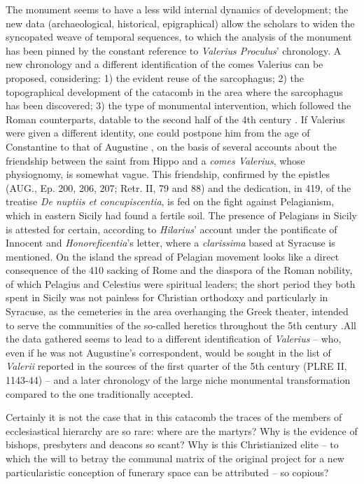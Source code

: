 \documentclass[amsthm,ebook]{saparticle}
\begin{document}
The monument seems to have a less wild internal dynamics of development; the new data (archaeological, historical, epigraphical) \citep[101-108]{SGARLATA1996} allow the scholars to widen the syncopated weave of temporal sequences, to which the analysis of the monument has been pinned by the constant reference to \emph{Valerius Proculus}’ chronology. A new chronology and a different identification of the comes Valerius can be proposed, considering: 1) the evident reuse of the sarcophagus; 2) the topographical development of the catacomb in the area where the sarcophagus has been discovered; 3) the type of monumental intervention, which followed the Roman counterparts, datable to the second half of the 4th century \citep[132-134]{FIOCCHINICOLAI1997}. If Valerius were given a different identity, one could postpone him from the age of Constantine to that of Augustine \citep[15-51]{SGARLATA1998}, on the basis of several accounts about the friendship between the saint from Hippo and a \emph{comes Valerius}, whose physiognomy, is somewhat vague. This friendship, confirmed by the epistles (AUG., Ep. 200, 206, 207; Retr. II, 79 and 88) and the dedication, in 419, of the treatise \emph{De nuptiis et concupiscentia}, is fed on the fight against Pelagianism, which in eastern Sicily had found a fertile soil. The presence of Pelagians in Sicily is attested for certain, according to \emph{Hilarius}’ account under the pontificate of Innocent \citep[429-452]{PIETRI2000} and \emph{Honoreficentia}’s letter, where a \emph{clarissima} based at Syracuse is mentioned. On the island the spread of Pelagian movement looks like a direct consequence of the 410 sacking of Rome and the diaspora of the Roman nobility, of which Pelagius and Celestius were spiritual leaders; the short period they both spent in Sicily was not painless for Christian orthodoxy %
 and particularly in Syracuse, as the cemeteries in the area overhanging the Greek theater, intended to serve the communities of the so-called heretics throughout the 5th century \citep{AGNELLO1990}.All the data gathered seems to lead to a different identification of \emph{Valerius} – who, even if he was not Augustine’s correspondent, would be sought in the list of \emph{Valerii} reported in the sources of the first quarter of the 5th century (PLRE II, 1143-44) – and a later chronology of the large niche monumental transformation compared to the one traditionally accepted.

Certainly it is not the case that in this catacomb the traces of the members of ecclesiastical hierarchy are so rare: where are the martyrs? Why is the evidence of bishops, presbyters and deacons so scant? Why is this Christianized elite – to which the will to betray the communal matrix of the original project for a new particularistic conception of funerary space can be attributed – so copious?
\end{document}
